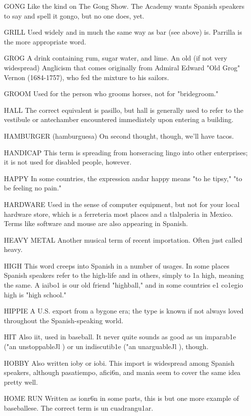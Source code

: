 GONG Like the kind on The Gong Show. The Academy
wants Spanish speakers to say and spell it gongo, but no one does, yet.

GRILL Used widely and in much the same way as bar (see
above) is. Parrilla is the more appropriate word.

GROG A drink containing rum, sugar water, and lime. An old
(if not very widespread) Anglicism that comes originally from Admiral
Edward "Old Grog" Vernon (1684-1757), who fed the mixture to his
sailors.

GROOM Used for the person who grooms horses, not for
"bridegroom."

HALL The correct equivalent is pasillo, but hall is generally
used to refer to the vestibule or antechamber encountered immediately
upon entering a building.

HAMBURGER (hamburguesa) On second thought, though,
we'll have tacos.

HANDICAP This term is spreading from horseracing lingo
into other enterprises; it is not used for disabled people, however.

HAPPY In some countries, the expression andar happy means
"to he tipsy," "to be feeling no pain."

HARDWARE Used in the sense of computer equipment, but
not for your local hardware store, which is a ferreteria most places and
a tlalpaleria in Mexico. Terms like software and mouse are also appearing in Spanish.

HEAVY METAL Another musical term of recent importation.
Often just called heavy.

HIGH This word creeps into Spanish in a number of usages.
In some places Spanish speakers refer to the high-life and in others,
simply to 1a high, meaning the same. A iaibo1 is our old friend "highball," and in some countries e1 co1egio high is "high school."

HIPPIE A U.S. export from a bygone era; the type is known if
not always loved throughout the Spanish-speaking world.

HIT Also iit, used in baseball. It never quite sounds as good as
un imparab1e ("an unstoppableJl ) or un indiscutib1e ("an unarguableJl ),
though.

HOBBY Also written ioby or iobi. This import is widespread
among Spanish speakers, although pasatiempo, afici6n, and mania
seem to cover the same idea pretty well.

HOME RUN Written as ionr6n in some parts, this is but one
more example of baseballese. The correct term is un cuadrangu1ar.

